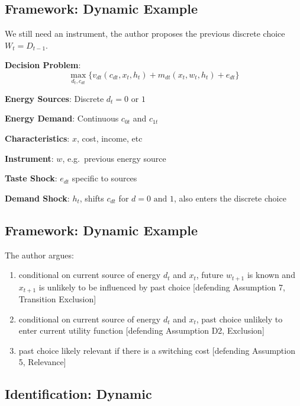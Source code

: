 \documentclass[
  letterpaper,
  DIV=11,
  numbers=noendperiod]{scrartcl}
\begin{document}
\subsection{Framework: Dynamic Example}\label{framework-dynamic-example}

We still need an instrument, the author proposes the previous discrete
choice \(W_t = D_{t-1}\).

\textbf{Decision Problem}:
\[\max_{d_t, c_{dt}} \{v_{dt}(c_{dt},x_t,h_t) + m_{dt}(x_t,w_t,h_t) + e_{dt} \}\]

\textbf{Energy Sources}: Discrete \(d_t = 0 \text{ or } 1\)

\textbf{Energy Demand}: Continuous \(c_{0t}\) and \(c_{1t}\)

\textbf{Characteristics}: \(x\), cost, income, etc

\textbf{Instrument}: \(w\), e.g.~previous energy source

\textbf{Taste Shock}: \(e_{dt}\) specific to sources

\textbf{Demand Shock}: \(h_t\), shifts \(c_{dt}\) for
\(d = 0 \text{ and } 1\), also enters the discrete choice

\subsection{Framework: Dynamic
Example}\label{framework-dynamic-example-1}

The author argues:

\begin{enumerate}
\def\labelenumi{\arabic{enumi})}
\item
  conditional on current source of energy \(d_t\) and \(x_t\), future
  \(w_{t+1}\) is known and \(x_{t+1}\) is unlikely to be influenced by
  past choice {[}defending Assumption 7, Transition Exclusion{]}
\item
  conditional on current source of energy \(d_t\) and \(x_t\), past
  choice unlikely to enter current utility function {[}defending
  Assumption D2, Exclusion{]}
\item
  past choice likely relevant if there is a switching cost {[}defending
  Assumption 5, Relevance{]}
\end{enumerate}

\subsection{Identification: Dynamic}\label{identification-dynamic}
\end{document}
